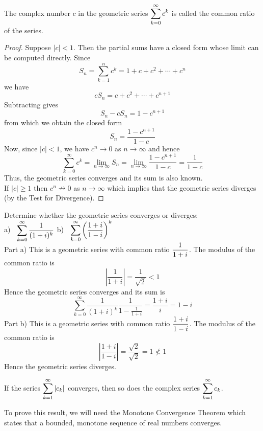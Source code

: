 \documentclass[handout]{ximera}
\begin{document}
\begin{remark}
The complex number $c$ in the geometric series $\displaystyle \sum_{k=0}^\infty c^k$ is called the common ratio of the series.
\end{remark}

\begin{proof}
Suppose $|c| < 1$. Then the partial sums have a closed form whose limit can be computed directly.
Since
\[
S_n = \sum_{k=1}^n c^k = 1+c+c^2+\cdots + c^n
\]
we have
\[
cS_n = c+c^2+\cdots + c^{n+1}
\]
Subtracting gives
\[
S_n - cS_n = 1-c^{n+1}
\]
from which we obtain the closed form
\[
S_n = \frac{1-c^{n+1}}{1-c}
\]
Now, since $|c|<1$, we have $c^n \to 0$ as $n \to \infty$ and hence
\[
\sum_{k=0}^\infty c^k = \lim_{n\to \infty} S_n = \lim_{n\to \infty} \frac{1-c^{n+1}}{1-c} = \frac{1}{1-c}
\]
Thus, the geometric series converges and its sum is also known.\\
If $|c| \geq 1$ then $c^n \nrightarrow 0$ as $n \to \infty$ which implies 
that the geometric series diverges (by the Test for Divergence).
\end{proof}


\begin{example}[example 2] 
Determine whether the geometric series converges or diverges:\\
a) $\;\;\displaystyle \sum_{k=0}^\infty \frac{1}{(1+i)^k}$ \quad b) $\;\;\displaystyle \sum_{k=0}^\infty \left(\frac{1+i}{1-i}\right)^k$ \\
Part a) This is a geometric series with common ratio $\displaystyle \frac{1}{1+i}$. The modulus of the common ratio is 
\[
\left|\frac{1}{1+i}\right| = \frac{1}{\sqrt 2} <1
\]
Hence the geometric series converges and its sum is
\[
\sum_{k=0}^\infty \frac{1}{(1+i)^k} \frac{1}{1-\frac{1}{1+i}} = \frac{1+i}{i} = 1-i
\]
Part b) This is a geometric series with common ratio $\displaystyle \frac{1+i}{1-i}$. The modulus of the common ratio is 
\[
\left|\frac{1+i}{1-i}\right| = \frac{\sqrt 2}{\sqrt 2} = 1 \nless 1
\]
Hence the geometric series diverges.
\end{example}



\begin{theorem}
If the series $\displaystyle \sum_{k=1}^\infty |c_k|$ converges, then so does the complex series $\displaystyle \sum_{k=1}^\infty c_k$.
\end{theorem}


\begin{remark}
To prove this result, we will need the Monotone Convergence Theorem which states that a bounded, monotone sequence of real numbers converges.
\end{remark}
\end{document}

